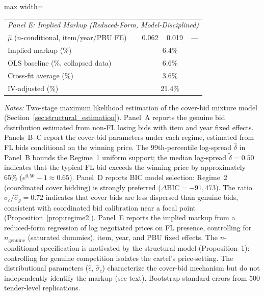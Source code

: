 \begin{table}[htbp]
\begin{adjustbox}{max width=\textwidth}
\begin{threeparttable}
\begin{tabular}{lccc}
\midrule
\multicolumn{4}{l}{\textit{Panel E: Implied Markup (Reduced-Form, Model-Disciplined)}} \\[3pt]
$\hat{\mu}$ ($n$-conditional, item/year/PBU FE) & 0.062 & 0.019 & --- \\
Implied markup (\%) & \multicolumn{3}{c}{6.4\%} \\
OLS baseline (\%, collapsed data) & \multicolumn{3}{c}{6.6\%} \\
Cross-fit average (\%) & \multicolumn{3}{c}{3.6\%} \\
IV-adjusted (\%) & \multicolumn{3}{c}{21.4\%} \\
\bottomrule
\end{tabular}
\begin{tablenotes}
\small
\item \textit{Notes:} Two-stage maximum likelihood estimation of the cover-bid
mixture model (Section~\ref{sec:structural_estimation}). Panel~A reports the
genuine bid distribution estimated from non-FL losing bids with item and year
fixed effects. Panels~B--C report the cover-bid parameters under each regime,
estimated from FL bids conditional on the winning price. The 99th-percentile
log-spread $\hat{\delta}$ in Panel~B bounds the Regime~1 uniform support;
the median log-spread $\tilde{\delta} = 0.50$ indicates that the typical FL
bid exceeds the winning price by approximately 65\%
($e^{0.50} - 1 \approx 0.65$). Panel~D reports BIC model selection: Regime~2
(coordinated cover bidding) is strongly preferred ($\Delta\text{BIC} =
-91{,}473$). The ratio $\hat{\sigma}_c / \hat{\sigma}_g = 0.72$ indicates
that cover bids are less dispersed than genuine bids, consistent with
coordinated bid calibration near a focal point (Proposition~\ref{prop:regime2}).
Panel~E reports the implied markup from a reduced-form regression
of log negotiated prices on FL presence, controlling for
$n_{\text{genuine}}$ (saturated dummies), item, year, and PBU fixed
effects. The $n$-conditional specification is motivated by the
structural model (Proposition~1): controlling for genuine competition
isolates the cartel's price-setting. The distributional parameters
($\hat{\epsilon}$, $\hat{\sigma}_c$) characterize the cover-bid
mechanism but do not independently identify the markup (see text).
Bootstrap standard errors from 500 tender-level replications.
\end{tablenotes}
\end{threeparttable}
\end{adjustbox}
\end{table}
